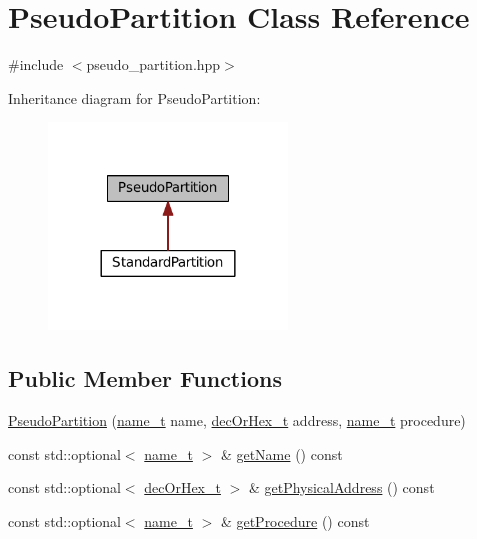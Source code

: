 \hypertarget{classPseudoPartition}{}\section{Pseudo\+Partition Class Reference}
\label{classPseudoPartition}


{\ttfamily \#include $<$pseudo\+\_\+partition.\+hpp$>$}



Inheritance diagram for Pseudo\+Partition\+:
\nopagebreak
\begin{figure}[H]
\begin{center}
\leavevmode
\includegraphics[width=180pt]{classPseudoPartition__inherit__graph}
\end{center}
\end{figure}
\subsection*{Public Member Functions}
\begin{DoxyCompactItemize}
\item 
\hyperlink{classPseudoPartition_a1e3df8b587bbca25afc930951ceea92a}{Pseudo\+Partition} (\hyperlink{structname__t}{name\+\_\+t} name, \hyperlink{general__types_8hpp_a0edc3a86ddf4aa205c6882b61cd7b4e9}{dec\+Or\+Hex\+\_\+t} address, \hyperlink{structname__t}{name\+\_\+t} procedure)
\item 
const std\+::optional$<$ \hyperlink{structname__t}{name\+\_\+t} $>$ \& \hyperlink{classPseudoPartition_afd3c3c1f153ca26e34fb0c8269232fd7}{get\+Name} () const 
\item 
const std\+::optional$<$ \hyperlink{general__types_8hpp_a0edc3a86ddf4aa205c6882b61cd7b4e9}{dec\+Or\+Hex\+\_\+t} $>$ \& \hyperlink{classPseudoPartition_ad6fb3afd813f3a073c4e2f66d7817bd1}{get\+Physical\+Address} () const 
\item 
const std\+::optional$<$ \hyperlink{structname__t}{name\+\_\+t} $>$ \& \hyperlink{classPseudoPartition_a604108a6d3f4437e4def9ad26d94d991}{get\+Procedure} () const 
\end{DoxyCompactItemize}


